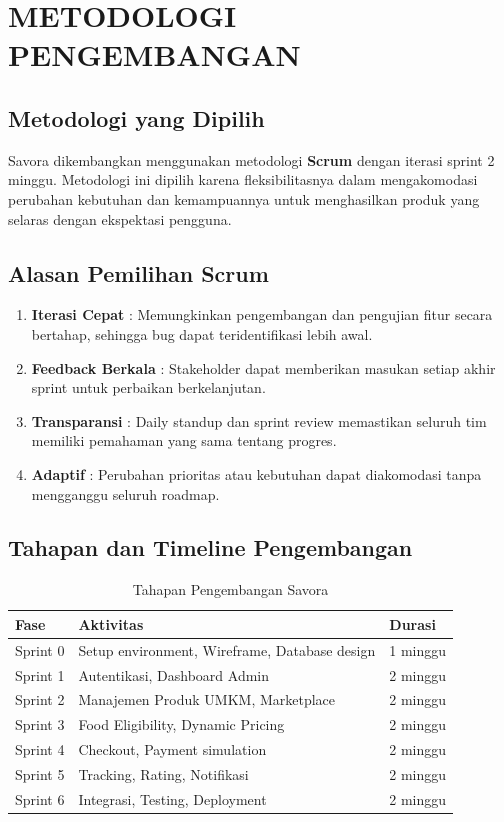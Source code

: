 \section{METODOLOGI PENGEMBANGAN}

\subsection{Metodologi yang Dipilih}

Savora dikembangkan menggunakan metodologi \textbf{Scrum} dengan iterasi sprint 2 minggu. Metodologi ini dipilih karena fleksibilitasnya dalam mengakomodasi perubahan kebutuhan dan kemampuannya untuk menghasilkan produk yang selaras dengan ekspektasi pengguna.

\subsection{Alasan Pemilihan Scrum}

\begin{enumerate}[leftmargin=*]
    \item \textbf{Iterasi Cepat} : Memungkinkan pengembangan dan pengujian fitur secara bertahap, sehingga bug dapat teridentifikasi lebih awal.
    \item \textbf{Feedback Berkala} : Stakeholder dapat memberikan masukan setiap akhir sprint untuk perbaikan berkelanjutan.
    \item \textbf{Transparansi} : Daily standup dan sprint review memastikan seluruh tim memiliki pemahaman yang sama tentang progres.
    \item \textbf{Adaptif} : Perubahan prioritas atau kebutuhan dapat diakomodasi tanpa mengganggu seluruh roadmap.
\end{enumerate}

\subsection{Tahapan dan Timeline Pengembangan}

\begin{table}[H]
\centering
\caption{Tahapan Pengembangan Savora}
\label{tab:tahapan}
\begin{tabularx}{\textwidth}{|l|X|X|}
\hline
\textbf{Fase} & \textbf{Aktivitas} & \textbf{Durasi} \\
\hline
Sprint 0 & Setup environment, Wireframe, Database design & 1 minggu \\
\hline
Sprint 1 & Autentikasi, Dashboard Admin & 2 minggu \\
\hline
Sprint 2 & Manajemen Produk UMKM, Marketplace & 2 minggu \\
\hline
Sprint 3 & Food Eligibility, Dynamic Pricing & 2 minggu \\
\hline
Sprint 4 & Checkout, Payment simulation & 2 minggu \\
\hline
Sprint 5 & Tracking, Rating, Notifikasi & 2 minggu \\
\hline
Sprint 6 & Integrasi, Testing, Deployment & 2 minggu \\
\hline
\end{tabularx}
\end{table}

